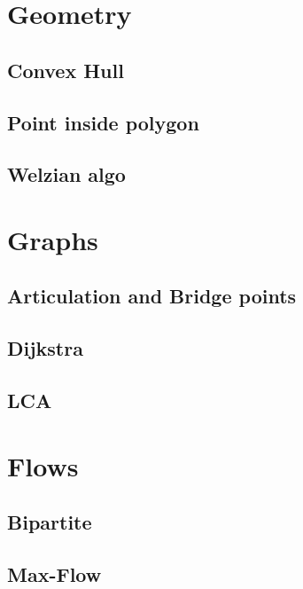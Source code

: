 \section{Geometry}
\subsection{Convex Hull}
\raggedbottom
\hrulefill
\subsection{Point inside polygon}
\raggedbottom
\hrulefill
\subsection{Welzian algo}
\raggedbottom
\hrulefill

\section{Graphs}
\subsection{Articulation and Bridge points}
\raggedbottom
\hrulefill
\subsection{Dijkstra}
\raggedbottom
\hrulefill
\subsection{LCA}
\raggedbottom
\hrulefill

\section{Flows}
\subsection{Bipartite}
\raggedbottom
\hrulefill
\subsection{Max-Flow}
\raggedbottom
\hrulefill
